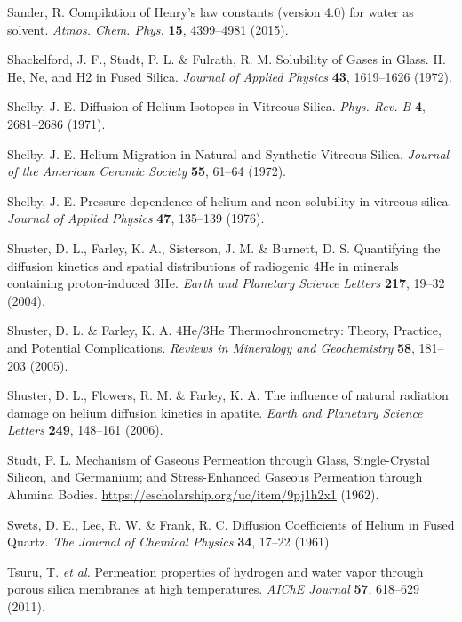 \documentclass[gchron, manuscript]{copernicus}
\begin{document}
\begin{thebibliography}{}
Sander, R. Compilation of Henry's law constants (version 4.0) for water as solvent. \emph{Atmos. Chem. Phys.} \textbf{15}, 4399--4981 (2015).

Shackelford, J. F., Studt, P. L. \& Fulrath, R. M. Solubility of Gases in Glass. II. He, Ne, and H2 in Fused Silica. \emph{Journal of Applied Physics} \textbf{43}, 1619--1626 (1972).

Shelby, J. E. Diffusion of Helium Isotopes in Vitreous Silica. \emph{Phys. Rev. B} \textbf{4}, 2681--2686 (1971).

Shelby, J. E. Helium Migration in Natural and Synthetic Vitreous Silica. \emph{Journal of the American Ceramic Society} \textbf{55}, 61--64 (1972).

Shelby, J. E. Pressure dependence of helium and neon solubility in vitreous silica. \emph{Journal of Applied Physics} \textbf{47}, 135--139 (1976).

Shuster, D. L., Farley, K. A., Sisterson, J. M. \& Burnett, D. S. Quantifying the diffusion kinetics and spatial distributions of radiogenic 4He in minerals containing proton-induced 3He. \emph{Earth and Planetary Science Letters} \textbf{217}, 19--32 (2004).

Shuster, D. L. \& Farley, K. A. 4He/3He Thermochronometry: Theory, Practice, and Potential Complications. \emph{Reviews in Mineralogy and Geochemistry} \textbf{58}, 181--203 (2005).

Shuster, D. L., Flowers, R. M. \& Farley, K. A. The influence of natural radiation damage on helium diffusion kinetics in apatite. \emph{Earth and Planetary Science Letters} \textbf{249}, 148--161 (2006).

Studt, P. L. Mechanism of Gaseous Permeation through Glass, Single-Crystal Silicon, and Germanium; and Stress-Enhanced Gaseous Permeation through Alumina Bodies. \url{https://escholarship.org/uc/item/9pj1h2x1} (1962).

Swets, D. E., Lee, R. W. \& Frank, R. C. Diffusion Coefficients of Helium in Fused Quartz. \emph{The Journal of Chemical Physics} \textbf{34}, 17--22 (1961).

Tsuru, T. \emph{et al.} Permeation properties of hydrogen and water vapor through porous silica membranes at high temperatures. \emph{AIChE Journal} \textbf{57}, 618--629 (2011).


\end{thebibliography}
\end{document}
